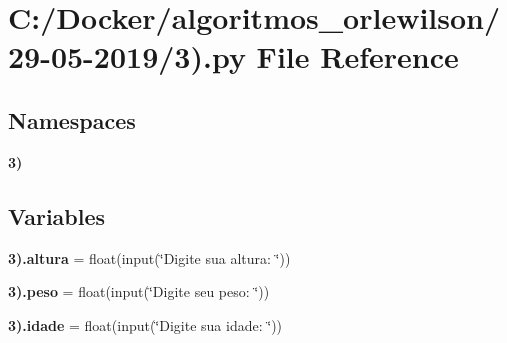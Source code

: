 \section{C\+:/\+Docker/algoritmos\+\_\+orlewilson/29-\/05-\/2019/3).py File Reference}
\label{29-05-2019_23_08_8py}
\subsection*{Namespaces}
\begin{DoxyCompactItemize}
\item 
 \textbf{ 3)}
\end{DoxyCompactItemize}
\subsection*{Variables}
\begin{DoxyCompactItemize}
\item 
\textbf{ 3).\+altura} = float(input(\char`\"{}Digite sua altura\+: \char`\"{}))
\item 
\textbf{ 3).\+peso} = float(input(\char`\"{}Digite seu peso\+: \char`\"{}))
\item 
\textbf{ 3).\+idade} = float(input(\char`\"{}Digite sua idade\+: \char`\"{}))
\end{DoxyCompactItemize}
